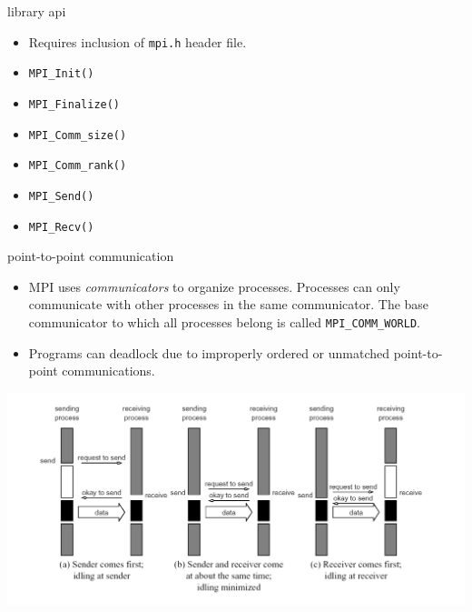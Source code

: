 \documentclass[10pt,t]{beamer}
\begin{document}
  \begin{frame}{library api}
    \begin{itemize}
      \item Requires inclusion of \texttt{mpi.h} header file.
    \end{itemize}

    \begin{itemize}
      \item \texttt{MPI\_Init()}
      \item \texttt{MPI\_Finalize()}
      \item \texttt{MPI\_Comm\_size()}
      \item \texttt{MPI\_Comm\_rank()}
      \item \texttt{MPI\_Send()}
      \item \texttt{MPI\_Recv()}
    \end{itemize}
  \end{frame}

  \begin{frame}{point-to-point communication}
    \begin{itemize}
      \item MPI uses \emph{communicators} to organize processes. Processes can
        only communicate with other processes in the same communicator. The base
        communicator to which all processes belong is called
        \texttt{MPI\_COMM\_WORLD}.

      \item Programs can deadlock due to improperly ordered or unmatched
        point-to-point communications.
    \end{itemize}

    \includegraphics[width=\textwidth]{blocking-comm.png}\\
  \end{frame}
\end{document}
